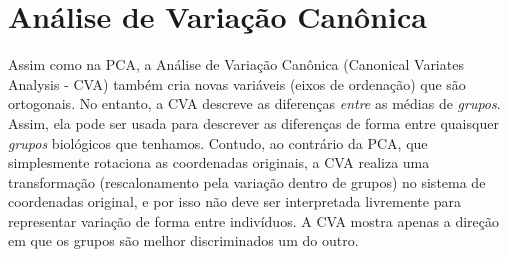 \documentclass[
]{book}
\begin{document}
\section{Análise de Variação Canônica}\label{anuxe1lise-de-variauxe7uxe3o-canuxf4nica}

Assim como na PCA, a Análise de Variação Canônica (Canonical Variates Analysis - CVA) também cria novas variáveis (eixos de ordenação) que são ortogonais. No entanto, a CVA descreve as diferenças \emph{entre} as médias de \emph{grupos}. Assim, ela pode ser usada para descrever as diferenças de forma entre quaisquer \emph{grupos} biológicos que tenhamos. Contudo, ao contrário da PCA, que simplesmente rotaciona as coordenadas originais, a CVA realiza uma transformação (rescalonamento pela variação dentro de grupos) no sistema de coordenadas original, e por isso não deve ser interpretada livremente para representar variação de forma entre indivíduos. A CVA mostra apenas a direção em que os grupos são melhor discriminados um do outro.
\end{document}

